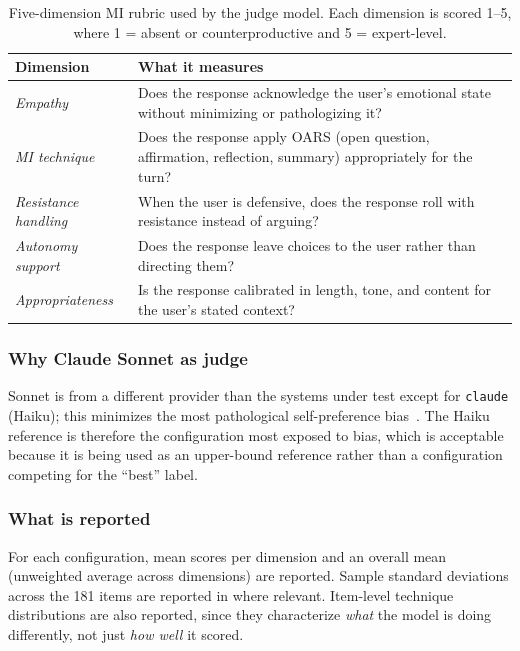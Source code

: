 \begin{table}[h]
\centering
\caption{Five-dimension MI rubric used by the judge model. Each dimension is
scored 1--5, where 1 = absent or counterproductive and 5 = expert-level.}
\label{tab:rubric}
\begin{tabularx}{\linewidth}{l X}
\toprule
\textbf{Dimension} & \textbf{What it measures} \\
\midrule
\textit{Empathy}              & Does the response acknowledge the user's emotional state without minimizing or pathologizing it? \\
\textit{MI technique}         & Does the response apply OARS (open question, affirmation, reflection, summary) appropriately for the turn? \\
\textit{Resistance handling}  & When the user is defensive, does the response roll with resistance instead of arguing? \\
\textit{Autonomy support}     & Does the response leave choices to the user rather than directing them? \\
\textit{Appropriateness}      & Is the response calibrated in length, tone, and content for the user's stated context? \\
\bottomrule
\end{tabularx}
\end{table}

\subsubsection*{Why Claude Sonnet as judge}
Sonnet is from a different provider than the systems under test except for
\texttt{claude} (Haiku); this minimizes the most pathological self-preference
bias~\cite{chiang2023closer}. The Haiku reference is therefore the
configuration most exposed to bias, which is acceptable because it is being
used as an upper-bound reference rather than a configuration competing for the
``best'' label.

\subsubsection*{What is reported}
For each configuration, mean scores per dimension and an overall mean
(unweighted average across dimensions) are reported. Sample standard
deviations across the 181 items are reported in  where
relevant. Item-level technique distributions are also reported, since they
characterize \emph{what} the model is doing differently, not just
\emph{how well} it scored.
